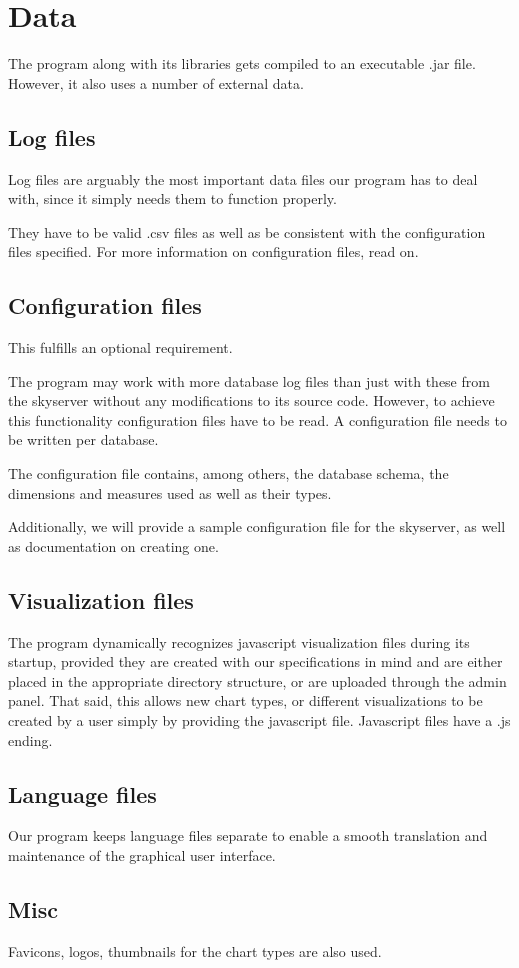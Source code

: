 \section{Data} %
The program along with its libraries gets compiled to an executable .jar file.
However, it also uses a number of external data.


\subsection{Log files}
Log files are arguably the most important data files our program has to deal with, since it simply needs them to function properly.

They have to be valid .csv files as well as be consistent with the configuration files specified. For more information on configuration files, read on.

\subsection{Configuration files}
This fulfills an optional requirement.

The program may work with more database log files than just with these from the skyserver without 
any modifications to its source code.
However, to achieve this functionality configuration files have to be read. A configuration file needs to be written per database.

The configuration file contains, among others, the database schema, the dimensions and measures used as well as their types.

Additionally, we will provide a sample configuration file for the skyserver, as well as documentation on creating one.

\subsection{Visualization files}
The program dynamically recognizes javascript visualization files during its startup, provided
they are created with our specifications in mind and are either placed in the appropriate directory structure, or are uploaded through the admin panel.
That said, this allows new chart types, or different visualizations to be created by a user simply by providing
the javascript file. Javascript files have a .js ending.

\subsection{Language files}
Our program keeps language files separate to enable a smooth translation and maintenance of the graphical user interface.

\subsection{Misc}
Favicons, logos, thumbnails for the chart types are also used.

